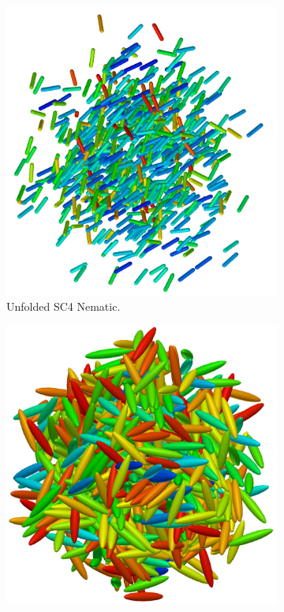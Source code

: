 \begin{figure}
  \begin{center}
    \begin{subfigure}{0.4\textwidth}
      \includegraphics[width=\textwidth]{assets/images/configs/nematic}
      \caption{Unfolded SC4 Nematic.}
    \end{subfigure}
    \begin{subfigure}{0.4\textwidth}
      \includegraphics[width=\textwidth]{assets/images/configs/iso}

\end{subfigure}
\end{center}
\end{figure}
